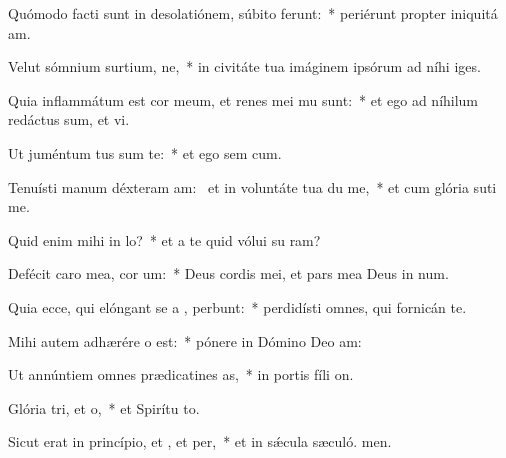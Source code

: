 \item Quómodo facti sunt in desolatiónem, súbito ferunt:~* periérunt propter iniquitá am.
\item Velut sómnium surtium, ne,~* in civitáte tua imáginem ipsórum ad níhi iges.
\item Quia inflammátum est cor meum, et renes mei mu sunt:~* et ego ad níhilum redáctus sum, et vi.
\item Ut juméntum tus sum  te:~* et ego sem cum.
\item Tenuísti manum déxteram am:~\pscross{} et in voluntáte tua du me,~* et cum glória suti me.
\item Quid enim mihi  in lo?~* et a te quid vólui su ram?
\item Defécit caro mea,  cor um:~* Deus cordis mei, et pars mea Deus in num.
\item Quia ecce, qui elóngant se a , perbunt:~* perdidísti omnes, qui fornicán  te.
\item Mihi autem adhærére o  est:~* pónere in Dómino Deo  am:
\item Ut annúntiem omnes prædicatines as,~* in portis fíli on.
\item Glória tri, et o,~* et Spirítu to.
\item Sicut erat in princípio, et , et per,~* et in sǽcula sæculó. men.
